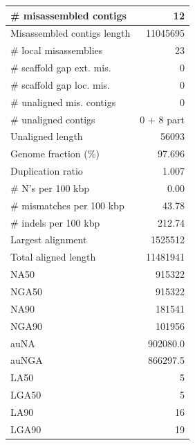 \documentclass[12pt,a4paper]{article}
\begin{document}
\begin{table}[ht]
\begin{center}
\begin{tabular}{|l*{1}{|r}|}
\# misassembled contigs & 12 \\ \hline
Misassembled contigs length & 11045695 \\ \hline
\# local misassemblies & 23 \\ \hline
\# scaffold gap ext. mis. & 0 \\ \hline
\# scaffold gap loc. mis. & 0 \\ \hline
\# unaligned mis. contigs & 0 \\ \hline
\# unaligned contigs & 0 + 8 part \\ \hline
Unaligned length & 56093 \\ \hline
Genome fraction (\%) & 97.696 \\ \hline
Duplication ratio & 1.007 \\ \hline
\# N's per 100 kbp & 0.00 \\ \hline
\# mismatches per 100 kbp & 43.78 \\ \hline
\# indels per 100 kbp & 212.74 \\ \hline
Largest alignment & 1525512 \\ \hline
Total aligned length & 11481941 \\ \hline
NA50 & 915322 \\ \hline
NGA50 & 915322 \\ \hline
NA90 & 181541 \\ \hline
NGA90 & 101956 \\ \hline
auNA & 902080.0 \\ \hline
auNGA & 866297.5 \\ \hline
LA50 & 5 \\ \hline
LGA50 & 5 \\ \hline
LA90 & 16 \\ \hline
LGA90 & 19 \\ \hline
\end{tabular}
\end{center}
\end{table}
\end{document}
